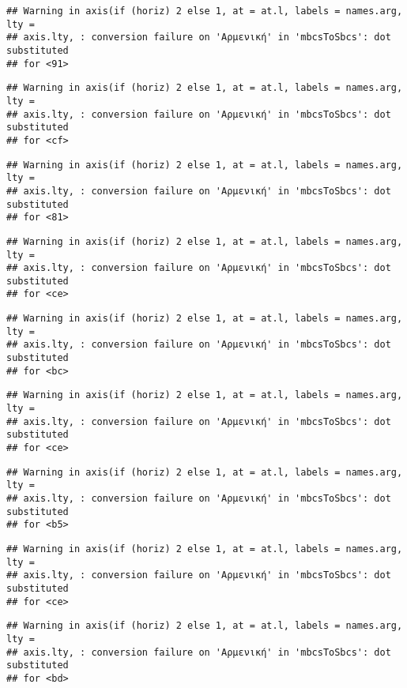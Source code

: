 \documentclass[
]{article}
\begin{document}
\begin{verbatim}
## Warning in axis(if (horiz) 2 else 1, at = at.l, labels = names.arg, lty =
## axis.lty, : conversion failure on 'Αρμενική' in 'mbcsToSbcs': dot substituted
## for <91>
\end{verbatim}

\begin{verbatim}
## Warning in axis(if (horiz) 2 else 1, at = at.l, labels = names.arg, lty =
## axis.lty, : conversion failure on 'Αρμενική' in 'mbcsToSbcs': dot substituted
## for <cf>
\end{verbatim}

\begin{verbatim}
## Warning in axis(if (horiz) 2 else 1, at = at.l, labels = names.arg, lty =
## axis.lty, : conversion failure on 'Αρμενική' in 'mbcsToSbcs': dot substituted
## for <81>
\end{verbatim}

\begin{verbatim}
## Warning in axis(if (horiz) 2 else 1, at = at.l, labels = names.arg, lty =
## axis.lty, : conversion failure on 'Αρμενική' in 'mbcsToSbcs': dot substituted
## for <ce>
\end{verbatim}

\begin{verbatim}
## Warning in axis(if (horiz) 2 else 1, at = at.l, labels = names.arg, lty =
## axis.lty, : conversion failure on 'Αρμενική' in 'mbcsToSbcs': dot substituted
## for <bc>
\end{verbatim}

\begin{verbatim}
## Warning in axis(if (horiz) 2 else 1, at = at.l, labels = names.arg, lty =
## axis.lty, : conversion failure on 'Αρμενική' in 'mbcsToSbcs': dot substituted
## for <ce>
\end{verbatim}

\begin{verbatim}
## Warning in axis(if (horiz) 2 else 1, at = at.l, labels = names.arg, lty =
## axis.lty, : conversion failure on 'Αρμενική' in 'mbcsToSbcs': dot substituted
## for <b5>
\end{verbatim}

\begin{verbatim}
## Warning in axis(if (horiz) 2 else 1, at = at.l, labels = names.arg, lty =
## axis.lty, : conversion failure on 'Αρμενική' in 'mbcsToSbcs': dot substituted
## for <ce>
\end{verbatim}

\begin{verbatim}
## Warning in axis(if (horiz) 2 else 1, at = at.l, labels = names.arg, lty =
## axis.lty, : conversion failure on 'Αρμενική' in 'mbcsToSbcs': dot substituted
## for <bd>
\end{verbatim}
\end{document}
